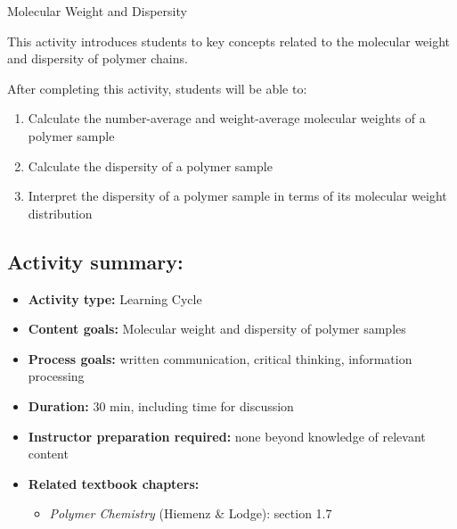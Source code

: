 %
%
%
%

\renewcommand{\figpath}{content/intro/M-and-D/figs}
\renewcommand{\labelbase}{M-and-D}

\begin{activity}{Molecular Weight and Dispersity}

\begin{instructornotes}

	This activity introduces students to key concepts related to the molecular weight and dispersity of polymer chains.
	
	After completing this activity, students will be able to:
			\begin{enumerate}
				\item Calculate the number-average and weight-average molecular weights of a polymer sample
				\item Calculate the dispersity of a polymer sample
				\item Interpret the dispersity of a polymer sample in terms of its molecular weight distribution
			\end{enumerate}
			
	\subsection*{Activity summary:}
	\begin{itemize}
		\item \textbf{Activity type:} Learning Cycle
		\item \textbf{Content goals:} Molecular weight and dispersity of polymer samples
		\item \textbf{Process goals:} %
			written communication, critical thinking, information processing
		\item \textbf{Duration:} 30 min, including time for discussion
		\item \textbf{Instructor preparation required:} none beyond knowledge of relevant content
		\item \textbf{Related textbook chapters:}
			\begin{itemize}
				\item \emph{Polymer Chemistry} (Hiemenz \& Lodge): section 1.7
			\end{itemize}
	\end{itemize}


\end{instructornotes}
\end{activity}
